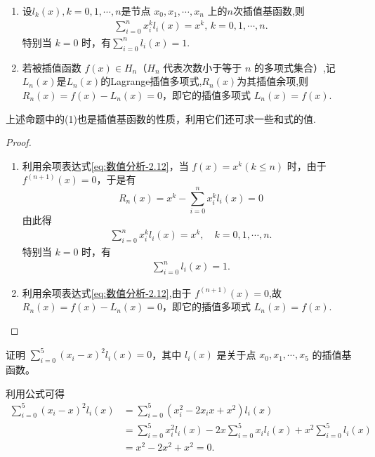 \documentclass[../../main.tex]{subfiles}
\begin{document}
\begin{proposition}\label{proposition:插值基函数和插值余项的性质}
\begin{enumerate}[(1)]
\item 设$l_k(x),k=0,1,\cdots,n$是节点 $x_0, x_1, \cdots, x_n$ 上的$n$次插值基函数,则
\begin{align*}
\sum_{i = 0}^n x_i^k l_i(x) = x^k, \, k = 0, 1, \cdots, n.
\end{align*}
特别当 $k = 0$ 时，有$\sum_{i = 0}^n l_i(x) = 1.$

\item 若被插值函数 $f(x) \in H_n$（$H_n$ 代表次数小于等于 $n$ 的多项式集合）,记$L_n(x)$是$L_n(x)$的Lagrange插值多项式,$R_n(x)$为其插值余项,则 $R_n(x) = f(x) - L_n(x) = 0$，即它的插值多项式 $L_n(x) = f(x)$.
\end{enumerate}
\end{proposition}
\begin{note}
上述命题中的(1)也是插值基函数的性质，利用它们还可求一些和式的值.
\end{note}
\begin{proof}
\begin{enumerate}[(1)]
\item 利用余项表达式\eqref{eq:数值分析-2.12}，当 $f(x) = x^k (k \leqslant n)$ 时，由于 $f^{(n + 1)}(x) = 0$，于是有 
\[
R_n(x) = x^k - \sum_{i = 0}^n x_i^k l_i(x) = 0
\]
由此得 
\begin{align*}
\sum_{i = 0}^n x_i^k l_i(x) = x^k, \quad k = 0, 1, \cdots, n.
\end{align*}
特别当 $k = 0$ 时，有 
\begin{align*}
\sum_{i = 0}^n l_i(x) = 1.
\end{align*}

\item 利用余项表达式\eqref{eq:数值分析-2.12},由于 $f^{(n + 1)}(x) = 0$,故 $R_n(x) = f(x) - L_n(x) = 0$，即它的插值多项式 $L_n(x) = f(x)$.
\end{enumerate}
\end{proof}

\begin{example}
证明 $\sum_{i = 0}^5 (x_i - x)^2 l_i(x) = 0$，其中 $l_i(x)$ 是关于点 $x_0, x_1, \cdots, x_5$ 的插值基函数。
\end{example}
\begin{solution}
利用公式可得 
\begin{align*}
\sum_{i = 0}^5 (x_i - x)^2 l_i(x) &= \sum_{i = 0}^5 (x_i^2 - 2x_i x + x^2) l_i(x) \\
&= \sum_{i = 0}^5 x_i^2 l_i(x) - 2x \sum_{i = 0}^5 x_i l_i(x) + x^2 \sum_{i = 0}^5 l_i(x) \\
&= x^2 - 2x^2 + x^2 = 0.
\end{align*}
\end{solution}
\end{document}
